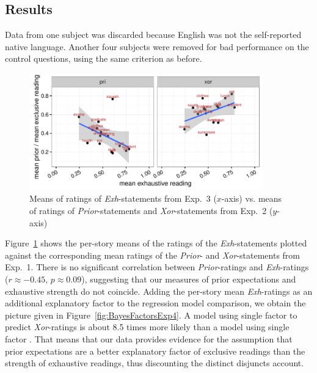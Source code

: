 \documentclass[12pt]{article}
\begin{document}
\subsection{Results}

Data from one subject was discarded because English was not the self-reported native
language. Another four subjects were removed for bad performance on the control questions,
using the same criterion as before.

\begin{figure}
  \centering
  \includegraphics[width=0.9\textwidth]{pics_02/correlationExhXorPri.pdf}
  \caption{Means of ratings of \emph{Exh}-statements from Exp.~3 ($x$-axis) vs. means of
    ratings of \emph{Prior}-statements and \emph{Xor}-statements from
    Exp.~2 ($y$-axis)}
\label{fig:CorrelationExp1Exp4}
\end{figure}

Figure~\ref{fig:CorrelationExp1Exp4} shows the per-story means of the ratings of the
\emph{Exh}-statements plotted against the corresponding mean ratings of the \emph{Prior}- and
\emph{Xor}-statements from Exp.~1. There is no significant correlation between
\emph{Prior}-ratings and \emph{Exh}-ratings ($r \approx -0.45$, $p \approx 0.09$), suggesting
that our measures of prior expectations and exhaustive strength do not coincide. Adding the
per-story mean \emph{Exh}-ratings as an additional explanatory factor \exh to the regression
model comparison, we obtain the picture given in Figure~\ref{fig:BayesFactorsExp4}. A model
using single factor \pri to predict \emph{Xor}-ratings is about 8.5 times more likely than a
model using single factor \exh. That means that our data provides evidence for the assumption
that prior expectations are a better explanatory factor of exclusive readings than the strength
of exhaustive readings, thus discounting the distinct disjuncts account.
\end{document}
